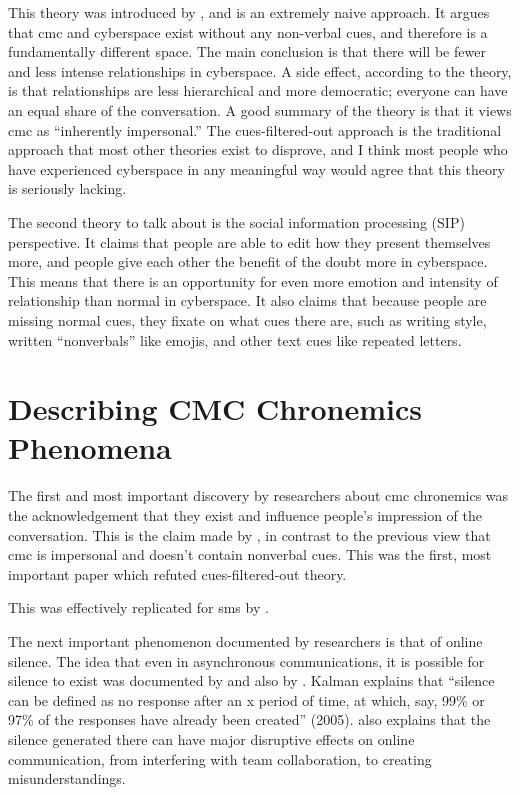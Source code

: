 \documentclass[
  stu]{apa7}
\begin{document}
This theory was introduced by \textcite{sproull91}, and is an extremely
naive approach. It argues that cmc and cyberspace exist without any
non-verbal cues, and therefore is a fundamentally different space. The
main conclusion is that there will be fewer and less intense
relationships in cyberspace. A side effect, according to the theory, is
that relationships are less hierarchical and more democratic; everyone
can have an equal share of the conversation. A good summary of the
theory is that it views cmc as ``inherently impersonal.'' The
cues-filtered-out approach is the traditional approach that most other
theories exist to disprove, and I think most people who have experienced
cyberspace in any meaningful way would agree that this theory is
seriously lacking.

The second theory to talk about is the social information processing
(SIP) perspective. It claims that people are able to edit how they
present themselves more, and people give each other the benefit of the
doubt more in cyberspace. This means that there is an opportunity for
even more emotion and intensity of relationship than normal in
cyberspace. It also claims that because people are missing normal cues,
they fixate on what cues there are, such as writing style, written
``nonverbals'' like emojis, and other text cues like repeated letters.

\hypertarget{describing-cmc-chronemics-phenomena}{%
\section{Describing CMC Chronemics
Phenomena}\label{describing-cmc-chronemics-phenomena}}

The first and most important discovery by researchers about cmc
chronemics was the acknowledgement that they exist and influence
people's impression of the conversation. This is the claim made by
\textcite{walther95}, in contrast to the previous view that cmc is
impersonal and doesn't contain nonverbal cues. This was the first, most
important paper which refuted cues-filtered-out theory.

This was effectively replicated for sms by \textcite{doring09}.

The next important phenomenon documented by researchers is that of
online silence. The idea that even in asynchronous communications, it is
possible for silence to exist was documented by \textcite{ravid} and
also by \textcite{kalman05}. Kalman explains that ``silence can be
defined as no response after an x period of time, at which, say, 99\% or
97\% of the responses have already been created'' (2005).
\textcite{kalman05} also explains that the silence generated there can
have major disruptive effects on online communication, from interfering
with team collaboration, to creating misunderstandings.
\end{document}
